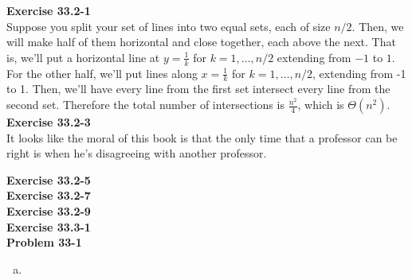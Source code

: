 \documentclass{article}
\begin{document}
\noindent\textbf{Exercise 33.2-1}\\

Suppose you split your set of lines into two equal sets, each of size $n/2$. Then, we will make half of them horizontal and close together, each above the next. That is, we'll put a horizontal line at $y = \frac{1}{k}$ for $k=1,\ldots, n/2$ extending from $-1$ to $1$. For the other half, we'll put lines along $x= \frac{1}{k}$ for $k=1,\ldots,n/2$, extending from -1 to 1. Then, we'll have every line from the first set intersect every line from the second set. Therefore the total number of intersections is $\frac{n^2}{4}$, which is $\Theta(n^2)$.\\



\noindent\textbf{Exercise 33.2-3}\\

It looks like the moral of this book is that the only time that a professor can be right is when he's disagreeing with another professor.%




\noindent\textbf{Exercise 33.2-5}\\


\noindent\textbf{Exercise 33.2-7}\\


\noindent\textbf{Exercise 33.2-9}\\


\noindent\textbf{Exercise 33.3-1}\\




\noindent\textbf{Problem 33-1}\\
\begin{enumerate}[a.]
\item
\end{enumerate}
\end{document}
